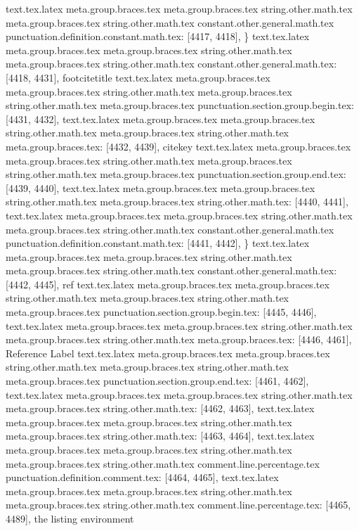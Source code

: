{{{{{{{{{{{{{{{{{{{{{{{{{{{{{{{{{{{{{{{{{{{{{{{{{{{{{{{{{{{{{{{{{{{{{{{{{{{{{{{{{{{{{{{{{{{{{{{{{{{{{{{{{{{{{{{{{{{{{{{{{{{{{{{{{{{{{{{{{{{{}
text.tex.latex meta.group.braces.tex meta.group.braces.tex string.other.math.tex meta.group.braces.tex string.other.math.tex constant.other.general.math.tex punctuation.definition.constant.math.tex: [4417, 4418], {\}
text.tex.latex meta.group.braces.tex meta.group.braces.tex string.other.math.tex meta.group.braces.tex string.other.math.tex constant.other.general.math.tex: [4418, 4431], {footcitetitle}
text.tex.latex meta.group.braces.tex meta.group.braces.tex string.other.math.tex meta.group.braces.tex string.other.math.tex meta.group.braces.tex punctuation.section.group.begin.tex: [4431, 4432], {{}
text.tex.latex meta.group.braces.tex meta.group.braces.tex string.other.math.tex meta.group.braces.tex string.other.math.tex meta.group.braces.tex: [4432, 4439], {citekey}
text.tex.latex meta.group.braces.tex meta.group.braces.tex string.other.math.tex meta.group.braces.tex string.other.math.tex meta.group.braces.tex punctuation.section.group.end.tex: [4439, 4440], {}}
text.tex.latex meta.group.braces.tex meta.group.braces.tex string.other.math.tex meta.group.braces.tex string.other.math.tex: [4440, 4441], {
}
text.tex.latex meta.group.braces.tex meta.group.braces.tex string.other.math.tex meta.group.braces.tex string.other.math.tex constant.other.general.math.tex punctuation.definition.constant.math.tex: [4441, 4442], {\}
text.tex.latex meta.group.braces.tex meta.group.braces.tex string.other.math.tex meta.group.braces.tex string.other.math.tex constant.other.general.math.tex: [4442, 4445], {ref}
text.tex.latex meta.group.braces.tex meta.group.braces.tex string.other.math.tex meta.group.braces.tex string.other.math.tex meta.group.braces.tex punctuation.section.group.begin.tex: [4445, 4446], {{}
text.tex.latex meta.group.braces.tex meta.group.braces.tex string.other.math.tex meta.group.braces.tex string.other.math.tex meta.group.braces.tex: [4446, 4461], {Reference Label}
text.tex.latex meta.group.braces.tex meta.group.braces.tex string.other.math.tex meta.group.braces.tex string.other.math.tex meta.group.braces.tex punctuation.section.group.end.tex: [4461, 4462], {}}
text.tex.latex meta.group.braces.tex meta.group.braces.tex string.other.math.tex meta.group.braces.tex string.other.math.tex: [4462, 4463], {
}
text.tex.latex meta.group.braces.tex meta.group.braces.tex string.other.math.tex meta.group.braces.tex string.other.math.tex: [4463, 4464], {
}
text.tex.latex meta.group.braces.tex meta.group.braces.tex string.other.math.tex meta.group.braces.tex string.other.math.tex comment.line.percentage.tex punctuation.definition.comment.tex: [4464, 4465], {%
text.tex.latex meta.group.braces.tex meta.group.braces.tex string.other.math.tex meta.group.braces.tex string.other.math.tex comment.line.percentage.tex: [4465, 4489], { the listing environment}
}}}}}}}}}}}}}}}}}}}}}}}}}}}}}}}}}}}}}}}}}}}}}}}}}}}}}}}}}}}}}}}}}}}}}}}}}}}}}}}}}}}}}}}}}}}}}}}}}}}}}}}}}}}}}}}}}}}}}}}}}}}}}}}}}}}}}}}}}}}}}}
